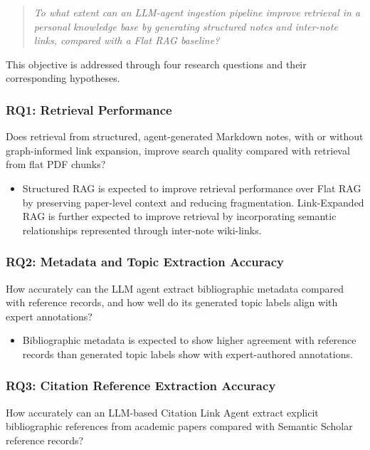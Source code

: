 \documentclass[runningheads]{llncs}
\begin{document}
\begin{quote}
\textit{To what extent can an LLM-agent ingestion pipeline improve retrieval in a personal knowledge base by generating structured notes and inter-note links, compared with a Flat RAG baseline?}
\end{quote}

This objective is addressed through four research questions and their corresponding hypotheses.

\subsubsection{RQ1: Retrieval Performance}

Does retrieval from structured, agent-generated Markdown notes, with or without graph-informed link expansion, improve search quality compared with retrieval from flat PDF chunks?

\begin{itemize}
\item[\textbf{H1:}] Structured RAG is expected to improve retrieval performance over Flat RAG by preserving paper-level context and reducing fragmentation. Link-Expanded RAG is further expected to improve retrieval by incorporating semantic relationships represented through inter-note wiki-links.
\end{itemize}

\subsubsection{RQ2: Metadata and Topic Extraction Accuracy}

How accurately can the LLM agent extract bibliographic metadata compared with reference records, and how well do its generated topic labels align with expert annotations?

\begin{itemize}
\item[\textbf{H2:}] Bibliographic metadata is expected to show higher agreement with reference records than generated topic labels show with expert-authored annotations.
\end{itemize}

\subsubsection{RQ3: Citation Reference Extraction Accuracy}

How accurately can an LLM-based Citation Link Agent extract explicit bibliographic references from academic papers compared with Semantic Scholar reference records?
\end{document}
